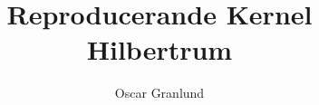 \documentclass[a4paper]{report}
\title{Reproducerande Kernel Hilbertrum}
\author{Oscar Granlund}
\begin{document}
\maketitle

\begin{abstract}
\end{abstract}
\end{document}
